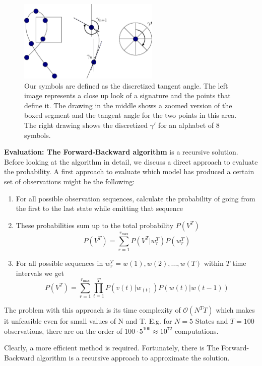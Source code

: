 \documentclass[a4paper, oneside]{csthesis}
\begin{document}
\begin{figure}[tb]
    \begin{center}
        \includegraphics[width=0.6\textwidth]{figures/symbol-creation.eps}
    \end{center}
    \caption{Our symbols are defined as the discretized tangent angle. The left image represents a close up look of a signature and the points that define it. The drawing in the middle shows a zoomed version of the boxed segment and the tangent angle for the two points in this area. The right drawing shows the discretized $\gamma\prime$ for an alphabet of 8 symbols.}
    \label{fig:hmm-symbol-creation}
\end{figure}


\textbf{Evaluation: The Forward-Backward algorithm} is a recursive solution. Before looking at the algorithm in detail, we discuss a direct approach to evaluate the probability. A first approach to evaluate which model has produced a certain set of observations might be the following:
\begin{enumerate}
\item For all possible observation sequences, calculate the probability of going from the first to the last state while emitting that sequence
\item These probabilities sum up to the total probability $P(V^T)$
$$P(V^T) = \sum\limits_{r=1}^{r_\text{max}} P(V^T | w_r^T)P(w_r^T)$$
\item For all possible sequences in $w_r^T = w(1), w(2), ..., w(T)$ within $T$ time intervals we get
$$P(V^T) = \sum\limits_{r=1}^{r_\text{max}} \prod\limits_{t=1}^T  P(v(t) | w_(t)) P(w(t)|w(t-1))$$
\end{enumerate}
The problem with this approach is its time complexity of $\mathcal{O}(N^TT)$ which makes it unfeasible even for small values of N and T. E.g. for $N=5$ States and $T=100$ observations, there are on the order of $100 \cdot 5^{100} \approx 10^{72}$ computations.

Clearly, a more efficient method is required. Fortunately, there is The Forward-Backward algorithm is a recursive approach to approximate the solution.
\end{document}
